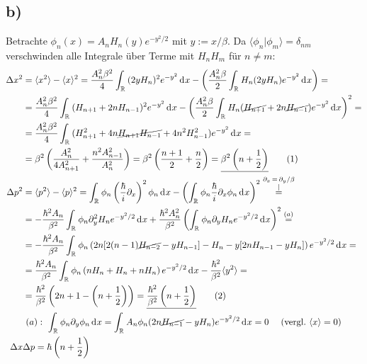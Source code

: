 \documentclass[a4paper,12pt]{article}
\newcommand\numberthis{\addtocounter{equation}{1}\tag{\theequation}}
\newcommand{\bra}{}
\newcommand{\kom}{}
\newcommand{\brak}{}
\newcommand{\intr}{}
\newcommand{\kla}{}
\begin{document}
\subsection*{b)}
Betrachte $\phi_n(x)=A_nH_n(y)e^{-y^2/2}$ mit $y:=x/\beta$. Da $\brak\langle {\phi_n}| {\phi_m}\rangle=\delta_{nm}$ verschwinden alle Integrale über Terme mit $H_nH_m$ für $n\neq m$:
\begin{align*}
\Delta x^2&=\bra\langle {x^2}\rangle-\bra\langle {x}\rangle^2=\frac{A_n^2\beta^2}{4}\intr\int_{\mathbb{R}^{ }}{(2yH_n)^2e^{-y^2}}\,\mathrm{d}^{ }x-\kla\left( {\frac{A_n^2\beta}{2}\intr\int_{\mathbb{R}^{ }}{H_n(2yH_n)e^{-y^2}}\,\mathrm{d}^{ }x} \right)= \\
&=\frac{A_n^2\beta^2}{4}\intr\int_{\mathbb{R}^{ }}{(H_{n+1}+2nH_{n-1})^2e^{-y^2}}\,\mathrm{d}^{ }x-\kla\left( {\frac{A_n^2\beta}{2}\intr\int_{\mathbb{R}^{ }}{H_n(\cancel{H_{n+1}}+2n\cancel{H_{n-1}})e^{-y^2}}\,\mathrm{d}^{ }x} \right)^2= \\
&= \frac{A_n^2\beta^2}{4}\intr\int_{\mathbb{R}^{ }}{(H_{n+1}^2+4n\cancel{H_{n+1}H_{n-1}}+4n^2H_{n-1}^2)e^{-y^2}}\,\mathrm{d}^{ }x = \\
&=\beta^2\kla\left( {\frac{A_n^2}{4A_{n+1}^2}+\frac{n^2A_{n-1}^2}{A_n^2}} \right)=\beta^2\kla\left( {\frac{n+1}{2}+\frac{n}{2}} \right)=\underline{\beta^2\kla\left( {n+\frac{1}{2}} \right)}\numberthis\label{Delta x^2} \\
\Delta p^2&=\bra\langle {p^2}\rangle -\bra\langle {p}\rangle^2=\intr\int_{\mathbb{R}^{ }}{\phi_n\left(\frac{\hbar}{i}\partial_x\right)^2\phi_n}\,\mathrm{d}^{ }x-\kla\left( {\intr\int_{\mathbb{R}^{ }}{\phi_n\frac{\hbar}{i}\partial_x\phi_n}\,\mathrm{d}^{ }x} \right)^2\kom\overset{\substack{{\partial_x\,=\,\partial_y/\beta} \\ |}}{=} \\
&=-\frac{\hbar^2A_n}{\beta^2}\intr\int_{\mathbb{R}^{ }}{\phi_n\partial_y^2H_ne^{-y^2/2}}\,\mathrm{d}^{ }x+\frac{\hbar^2A_n^2}{\beta^2}\kla\left( {\intr\int_{\mathbb{R}^{ }}{\phi_n\partial_yH_ne^{-y^2/2}}\,\mathrm{d}^{ }x} \right)^2\overset{(a)}{=} \\
&= -\frac{\hbar^2A_n}{\beta^2}\intr\int_{\mathbb{R}^{ }}{\phi_n\kla\left( {2n[2(n-1)\cancel{H_{n-2}}-yH_{n-1}]-H_n-y[2nH_{n-1}-yH_n]} \right)e^{-y^2/2}}\,\mathrm{d}^{ }x = \\
&= \frac{\hbar^2A_n}{\beta^2}\intr\int_{\mathbb{R}^{ }}{\phi_n\kla\left( {nH_n+H_n+nH_n} \right)e^{-y^2/2}}\,\mathrm{d}^{ }x-\frac{\hbar^2}{\beta^2}\brak\langle {y^2}\rangle = \\
&=\frac{\hbar^2}{\beta^2}\kla\left( {2n+1-\kla\left( {n+\frac{1}{2}} \right)} \right)=\underline{\frac{\hbar^2}{\beta^2}\kla\left( {n+\frac{1}{2}} \right)}   \numberthis\label{Delta p^2} \\
&\ (a):\ \intr\int_{\mathbb{R}^{ }}{\phi_n\partial_y\phi_n}\,\mathrm{d}^{ }x=\intr\int_{\mathbb{R}^{ }}{A_n\phi_n(2n\cancel{H_{n-1}}-yH_n)e^{-y^2/2}}\,\mathrm{d}^{ }x=0\ \ \ \ (\mathrm{vergl.\ }\bra\langle {x}\rangle=0)\\
\Delta x&\Delta p= \hbar\kla\left( {n+\frac{1}{2}} \right)
\end{align*}
\end{document}
